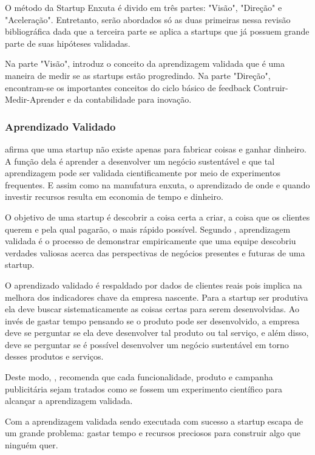 O método da Startup Enxuta é divido em três partes: "Visão", "Direção" e "Aceleração". Entretanto, serão abordados só as duas primeiras nessa revisão bibliográfica dada que a terceira parte se aplica a startups que já possuem grande parte de suas hipóteses validadas.

Na parte "Visão",  introduz o conceito da aprendizagem validada que é uma maneira de medir se as startups estão progredindo. Na parte "Direção", encontram-se os importantes conceitos do ciclo básico de feedback Contruir-Medir-Aprender e da contabilidade para inovação.


\subsubsection{Aprendizado Validado}
\label{cha:apredizado_validado}
 afirma que uma startup não existe apenas para fabricar coisas e ganhar dinheiro. A função dela é aprender a desenvolver um negócio sustentável e que tal aprendizagem pode ser validada cientificamente por meio de experimentos frequentes. E assim como na manufatura enxuta, o aprendizado de onde e quando investir recursos resulta em economia de tempo e dinheiro.

O objetivo de uma startup é descobrir a coisa certa a criar, a coisa que os clientes querem e pela qual pagarão, o mais rápido possível. Segundo , aprendizagem validada é o processo de demonstrar empiricamente que uma equipe descobriu verdades valiosas acerca das perspectivas de negócios presentes e futuras de uma startup.

O aprendizado validado é respaldado por dados de clientes reais pois implica na melhora dos indicadores chave da empresa nascente. Para a startup ser produtiva ela deve buscar sistematicamente as coisas certas para serem desenvolvidas. Ao invés de gastar tempo pensando se o produto pode ser desenvolvido, a empresa deve se perguntar se ela deve desenvolver tal produto ou tal serviço, e além disso, deve se perguntar se é possível desenvolver um negócio sustentável em torno desses produtos e serviços. \cite{leanstartup}

Deste modo, , recomenda que cada funcionalidade, produto e campanha publicitária sejam tratados como se fossem um experimento científico para alcançar a aprendizagem validada.

Com a aprendizagem validada sendo executada com sucesso a startup escapa de um grande problema: gastar tempo e recursos preciosos para construir algo que ninguém quer.


